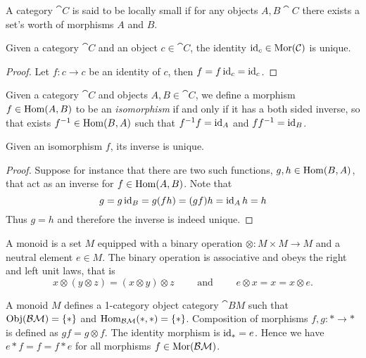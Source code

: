 \begin{definition}
  A category \(\cat C\) is said to be locally small if for any objects \(A,B
  \cat C\) there exists a set's worth of morphisms \(A\) and \(B\).
\end{definition}

\begin{corollary}\label{cor: unique identity}
  Given a category \(\cat C\) and an object \(c \in \cat C\), the identity
  \(\operatorname{id}_c \in \operatorname{Mor}(\mathcal C)\) is unique.
\end{corollary}

\begin{proof}
  Let \(f: c \to c\) be an identity of \(c\), then \(f = f \operatorname{id}_c = \operatorname{id}_c\).
\end{proof}

\begin{definition}
  Given a category \(\cat{C}\) and objects  \(A, B \in \cat{C}\), we
  define a morphism \(f \in \operatorname{Hom}(A, B)\) to be an \emph{isomorphism} if
  and only if it has a both sided inverse, so that exists \(f^{-1} \in
  \operatorname{Hom}(B, A)\) such that \(f^{-1}f = \operatorname{id}_A\) and  \(ff^{-1} =
  \operatorname{id}_B\).
\end{definition}

\begin{proposition}\label{prop: iso unique inverse}
   Given an isomorphism \(f\), its inverse is unique.
\end{proposition}

\begin{proof}
   Suppose for instance that there are two such functions, \(g, h \in
   \operatorname{Hom}(B, A)\), that act as an inverse for \(f \in \operatorname{Hom}(A,
   B)\). Note that
   \[
      g = g \operatorname{id}_B = g(f h) = (g f) h = \operatorname{id}_A h = h
   \]
   Thus \(g = h\) and therefore the inverse is indeed unique.
\end{proof}

\begin{definition}[Monoid]\label{def: monoid}
  A monoid is a set \(M\) equipped with a binary operation \(\otimes: M \times M
  \to M\) and a neutral element \(e \in M\). The binary operation is associative
  and obeys the right and left unit laws, that is
  \[
    x \otimes (y \otimes z) = (x \otimes y) \otimes z \qquad \text{ and } \qquad
    e \otimes x = x = x \otimes e.
  \]
\end{definition}

\begin{example}
  A monoid \(M\) defines a 1-category object category \(\cat{BM}\) such that
  \(\operatorname{Obj}(\mathcal{BM}) = \{*\}\) and \(\operatorname{Hom}_{\mathcal{BM}}(*, *) = \{*\}\). Composition
  of morphisms \(f, g: * \to *\) is defined as \(g  f = g \otimes f\). The
  identity morphism is \(\operatorname{id}_* = e\). Hence we have \(e * f = f = f * e\) for
  all morphisms \(f \in \operatorname{Mor}(\mathcal{BM})\).
\end{example}

